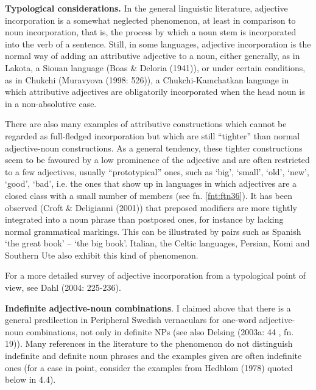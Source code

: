 \textbf{Typological considerations.} In the general linguistic literature, adjective incorporation is a somewhat neglected phenomenon, at least in comparison to noun incorporation, that is, the process by which a noun stem is incorporated into the verb of a sentence. Still, in some languages, adjective incorporation is the normal way of adding an attributive adjective to a noun, either generally, as in Lakota, a Siouan language (Boas \& Deloria (1941)), or under certain conditions, as in Chukchi (Muravyova (1998: 526)), a Chukchi-Kamchatkan language in which attributive adjectives are obligatorily incorporated when the head noun is in a non-absolutive case.

There are also many examples of attributive constructions which cannot be regarded as full-fledged incorporation but which are still “tighter” than normal adjective-noun constructions. As a general tendency, these tighter constructions seem to be favoured by a low prominence of the adjective and are often restricted to a few adjectives, usually “prototypical” ones, such as ‘big’, ‘small’, ‘old’, ‘new’, ‘good’, ‘bad’, i.e. the ones that show up in languages in which adjectives are a closed class with a small number of members (see fn. \ref{fnt:ftn36}). It has been observed (Croft \& Deligianni (2001)) that preposed modifiers are more tightly integrated into a noun phrase than postposed ones, for instance by lacking normal grammatical markings. This can be illustrated by pairs such as Spanish ‘the great book’ –  ‘the big book’. Italian, the Celtic languages, Persian, Komi and Southern Ute also exhibit this kind of phenomenon. 

For a more detailed survey of adjective incorporation from a typological point of view, see Dahl (2004: 225-236).

\textbf{Indefinite adjective-noun combinations}. I claimed above that there is a general predilection in Peripheral Swedish vernaculars for one-word adjective-noun combinations, not only in definite NPs (see also Delsing (2003a: 44 , fn. 19)). Many references in the literature to the phenomenon do not distinguish indefinite and definite noun phrases and the examples given are often indefinite ones (for a case in point, consider the examples from Hedblom (1978) quoted below in 4.4). 

